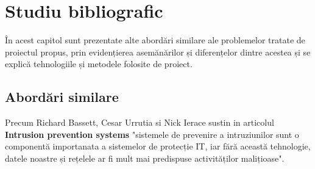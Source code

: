 
 \chapter{Studiu bibliografic}
\label{cap:studiu-bibliografic}
%
%
%
În acest capitol sunt prezentate alte abordări similare ale problemelor tratate de proiectul propus, prin evidențierea asemănărilor și diferențelor dintre acestea și se explică tehnologiile și metodele folosite de proiect. 

 \section{Abordări similare}

%
%





Precum Richard Bassett, Cesar Urrutia si 	 Nick Ierace sustin in articolul \textbf{Intrusion prevention systems} \cite{ips}  "sistemele de prevenire a intruziunilor sunt o componentă importanata a sistemelor de protecție IT, iar fără această tehnologie, datele noastre și rețelele ar fi mult mai predispuse activităților malițioase". 

